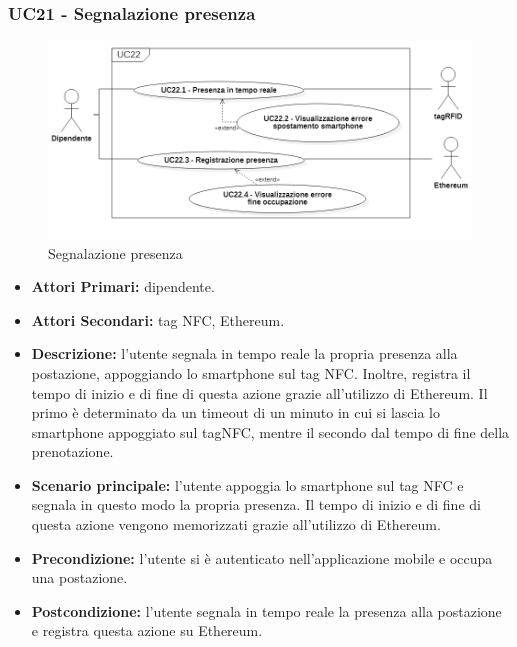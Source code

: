 \subsubsection{ UC21 - Segnalazione presenza}
\begin{figure}[H]
	\centering
	\includegraphics[width=15cm]{res/images/UC21.png}
	\caption{Segnalazione presenza}
	\label{fig:Segnalazione presenza}
\end{figure}
\begin{itemize}
	\item\textbf{Attori Primari:} dipendente.
	\item\textbf{Attori Secondari:} tag NFC, Ethereum.
	\item\textbf{Descrizione:} l’utente segnala in tempo reale la propria presenza alla postazione, appoggiando lo smartphone sul tag NFC. Inoltre, registra il tempo di inizio e di fine di questa azione grazie all'utilizzo di Ethereum. Il primo è determinato da un timeout di un minuto in cui si lascia lo smartphone appoggiato sul tagNFC, mentre il secondo dal tempo di fine della prenotazione.
	\item\textbf{Scenario principale:} l’utente appoggia lo smartphone sul tag NFC e segnala in questo modo la propria presenza.
	Il tempo di inizio e di fine di questa azione vengono memorizzati grazie all'utilizzo di Ethereum.
	\item\textbf{Precondizione:} l’utente si è autenticato nell'applicazione mobile e occupa una postazione.
	\item\textbf{Postcondizione:} l’utente segnala in tempo reale la presenza alla postazione e registra questa azione su Ethereum.
\end{itemize}



